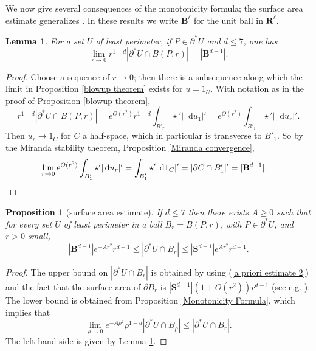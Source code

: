 \documentclass[reqno,12pt,letterpaper]{amsart}
\newcommand{\RR}{\mathbf{R}}
\newcommand{\Sph}{\mathbf S}
\newcommand{\Ball}{\mathbf{B}}
\newcommand*\dif{\mathop{}\!\mathrm{d}}
\newtheorem{lemma}[theorem]{Lemma}
\newtheorem{proposition}[theorem]{Proposition}
\theoremstyle{definition}
\numberwithin{equation}{section}
\begin{document}
We now give several consequences of the monotonicity formula; the surface area estimate generalizes \cite[Remark 5.13]{Giusti77}.
In these results we write $\Ball^\ell$ for the unit ball in $\RR^\ell$.

\begin{lemma}\label{least perimeter minimal size}
For a set $U$ of least perimeter, if $P \in \partial^* U$ and $d \leq 7$, one has
$$\lim_{r \to 0} r^{1 - d} |\partial^* U \cap B(P, r)| = |\Ball^{d - 1}|.$$
\end{lemma}
\begin{proof}
Choose a sequence of $r \to 0$; then there is a subsequence along which the limit in Proposition \ref{blowup theorem} exists for $u = 1_U$.
With notation as in the proof of Proposition \ref{blowup theorem},
$$r^{1 - d} |\partial^* U \cap B(P, r)| = e^{O(r^2)} r^{1 - d}\int_{B'_r} \star'|\dif u_1|' = e^{O(r^2)} \int_{B'_1} \star'|\dif u_r|'.$$
Then $u_r \to 1_C$ for $C$ a half-space, which in particular is transverse to $B'_1$.
So by the Miranda stability theorem, Proposition \ref{Miranda convergence},
\begin{align*}
\lim_{r \to 0} e^{O(r^2)} \int_{B'_1} \star'|\dif u_r|' &= \int_{B'_1} \star'|\dif 1_C|' = |\partial C \cap B'_1|' = |\Ball^{d - 1}|. \qedhere
\end{align*}
\end{proof}

\begin{proposition}[surface area estimate]\label{doubling dimension}
If $d \leq 7$ then there exists $A \geq 0$ such that for every set $U$ of least perimeter in a ball $B_r = B(P, r)$, with $P \in \partial^* U$, and $r > 0$ small,
$$|\Ball^{d - 1}|e^{-Ar^2}r^{d - 1} \leq |\partial^*U \cap B_r| \leq |\Sph^{d - 1}|e^{Ar^2} r^{d - 1}.$$
\end{proposition}
\begin{proof}
The upper bound on $|\partial^* U \cap B_r|$ is obtained by using (\ref{a priori estimate 2}) and the fact that the surface area of $\partial B_r$ is $|\Sph^{d - 1}|(1 + O(r^2))r^{d - 1}$ (see e.g. \cite{gray1974volume}).
The lower bound is obtained from Proposition \ref{Monotonicity Formula}, which implies that
$$\lim_{\rho \to 0} e^{-A\rho^2} \rho^{1 - d} |\partial^* U \cap B_\rho| \leq |\partial^* U \cap B_r|.$$
The left-hand side is given by Lemma \ref{least perimeter minimal size}.
\end{proof}
\end{document}
